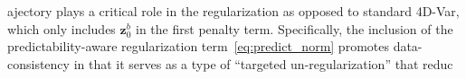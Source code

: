 \documentclass[final,1p,times]{elsarticle}
\begin{document}
ajectory plays a critical role in the regularization as opposed to standard 4D-Var, which only includes $\mathbf{z}_0^b$ in the first penalty term. Specifically, the inclusion of the predictability-aware regularization term~\eqref{eq:predict_norm} promotes data-consistency in that it serves as a type of ``targeted un-regularization'' that reduc
\end{document}
